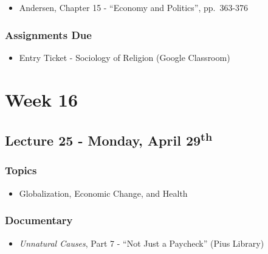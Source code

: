 \documentclass[]{book}
\providecommand{\tightlist}{%
  \setlength{\itemsep}{0pt}\setlength{\parskip}{0pt}}
\begin{document}
\begin{itemize}
\tightlist
\item
  Andersen, Chapter 15 - ``Economy and Politics'', pp.~363-376
\end{itemize}

\hypertarget{assignments-due-7}{%
\subsubsection*{Assignments Due}\label{assignments-due-7}}

\begin{itemize}
\tightlist
\item
  Entry Ticket - Sociology of Religion (Google Classroom)
\end{itemize}

\hypertarget{week-16}{%
\section*{Week 16}\label{week-16}}

\hypertarget{lecture-25---monday-april-29th}{%
\subsection*{\texorpdfstring{Lecture 25 - Monday, April 29\textsuperscript{th}}{Lecture 25 - Monday, April 29th}}\label{lecture-25---monday-april-29th}}

\hypertarget{topics-29}{%
\subsubsection*{Topics}\label{topics-29}}

\begin{itemize}
\tightlist
\item
  Globalization, Economic Change, and Health
\end{itemize}

\hypertarget{documentary-4}{%
\subsubsection*{Documentary}\label{documentary-4}}

\begin{itemize}
\tightlist
\item
  \emph{Unnatural Causes}, Part 7 - ``Not Just a Paycheck'' (Pius Library)
\end{itemize}
\end{document}
